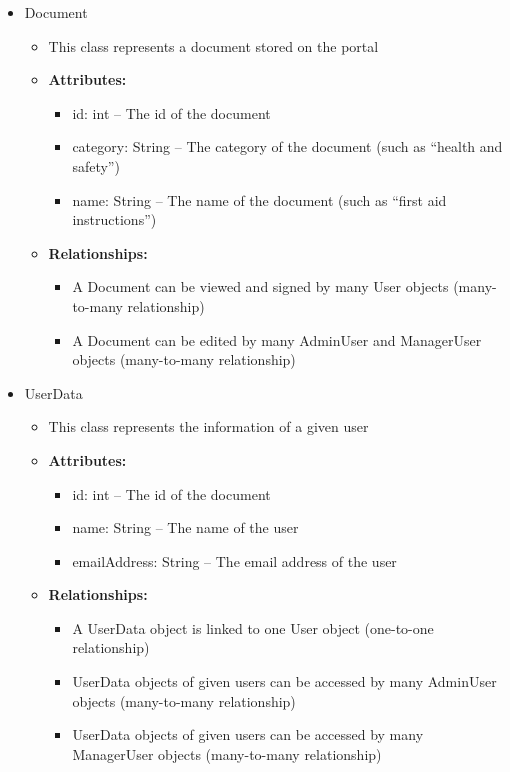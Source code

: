 \documentclass[12pt]{article}
\begin{document}
\begin{itemize}
  \item Document
    \begin{itemize}
      \item This class represents a document stored on the portal
      \item \textbf{Attributes:}
        \begin{itemize}
          \item id: int -- The id of the document
          \item category: String -- The category of the document
            (such as ``health and safety'')
          \item name: String -- The name of the document (such as
            ``first aid instructions'')
        \end{itemize}
      \item \textbf{Relationships:}
        \begin{itemize}
          \item A Document can be viewed and signed by many User
            objects (many-to-many relationship)
          \item A Document can be edited by many AdminUser and
            ManagerUser objects (many-to-many relationship)
        \end{itemize}
    \end{itemize}

  \item UserData
    \begin{itemize}
      \item This class represents the information of a given user
      \item \textbf{Attributes:}
        \begin{itemize}
          \item id: int -- The id of the document
          \item name: String -- The name of the user
          \item emailAddress: String -- The email address of the user
        \end{itemize}
      \item \textbf{Relationships:}
        \begin{itemize}
          \item A UserData object is linked to one User object
            (one-to-one relationship)
          \item UserData objects of given users can be accessed by
            many AdminUser objects (many-to-many relationship)
          \item UserData objects of given users can be accessed by
            many ManagerUser objects (many-to-many relationship)
        \end{itemize}
    \end{itemize}

\end{itemize}
\end{document}
